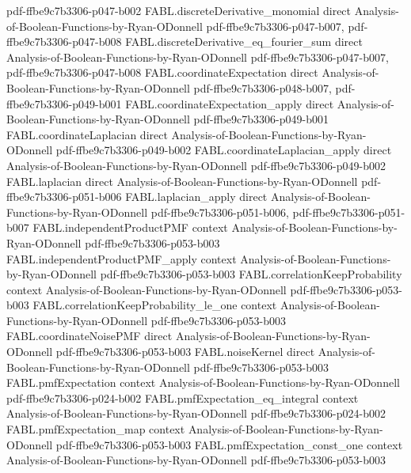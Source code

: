 \begin{theorem}
  {pdf-ffbe9c7b3306-p047-b002}
\proofstep
  {FABL.discreteDerivative_monomial}
  {direct}
  {Analysis-of-Boolean-Functions-by-Ryan-ODonnell}
  {pdf-ffbe9c7b3306-p047-b007,
    pdf-ffbe9c7b3306-p047-b008}
\proofstep
  {FABL.discreteDerivative_eq_fourier_sum}
  {direct}
  {Analysis-of-Boolean-Functions-by-Ryan-ODonnell}
  {pdf-ffbe9c7b3306-p047-b007,
    pdf-ffbe9c7b3306-p047-b008}
\proofstep
  {FABL.coordinateExpectation}
  {direct}
  {Analysis-of-Boolean-Functions-by-Ryan-ODonnell}
  {pdf-ffbe9c7b3306-p048-b007,
    pdf-ffbe9c7b3306-p049-b001}
\proofstep
  {FABL.coordinateExpectation_apply}
  {direct}
  {Analysis-of-Boolean-Functions-by-Ryan-ODonnell}
  {pdf-ffbe9c7b3306-p049-b001}
\proofstep
  {FABL.coordinateLaplacian}
  {direct}
  {Analysis-of-Boolean-Functions-by-Ryan-ODonnell}
  {pdf-ffbe9c7b3306-p049-b002}
\proofstep
  {FABL.coordinateLaplacian_apply}
  {direct}
  {Analysis-of-Boolean-Functions-by-Ryan-ODonnell}
  {pdf-ffbe9c7b3306-p049-b002}
\proofstep
  {FABL.laplacian}
  {direct}
  {Analysis-of-Boolean-Functions-by-Ryan-ODonnell}
  {pdf-ffbe9c7b3306-p051-b006}
\proofstep
  {FABL.laplacian_apply}
  {direct}
  {Analysis-of-Boolean-Functions-by-Ryan-ODonnell}
  {pdf-ffbe9c7b3306-p051-b006,
    pdf-ffbe9c7b3306-p051-b007}
\proofstep
  {FABL.independentProductPMF}
  {context}
  {Analysis-of-Boolean-Functions-by-Ryan-ODonnell}
  {pdf-ffbe9c7b3306-p053-b003}
\proofstep
  {FABL.independentProductPMF_apply}
  {context}
  {Analysis-of-Boolean-Functions-by-Ryan-ODonnell}
  {pdf-ffbe9c7b3306-p053-b003}
\proofstep
  {FABL.correlationKeepProbability}
  {context}
  {Analysis-of-Boolean-Functions-by-Ryan-ODonnell}
  {pdf-ffbe9c7b3306-p053-b003}
\proofstep
  {FABL.correlationKeepProbability_le_one}
  {context}
  {Analysis-of-Boolean-Functions-by-Ryan-ODonnell}
  {pdf-ffbe9c7b3306-p053-b003}
\proofstep
  {FABL.coordinateNoisePMF}
  {direct}
  {Analysis-of-Boolean-Functions-by-Ryan-ODonnell}
  {pdf-ffbe9c7b3306-p053-b003}
\proofstep
  {FABL.noiseKernel}
  {direct}
  {Analysis-of-Boolean-Functions-by-Ryan-ODonnell}
  {pdf-ffbe9c7b3306-p053-b003}
\proofstep
  {FABL.pmfExpectation}
  {context}
  {Analysis-of-Boolean-Functions-by-Ryan-ODonnell}
  {pdf-ffbe9c7b3306-p024-b002}
\proofstep
  {FABL.pmfExpectation_eq_integral}
  {context}
  {Analysis-of-Boolean-Functions-by-Ryan-ODonnell}
  {pdf-ffbe9c7b3306-p024-b002}
\proofstep
  {FABL.pmfExpectation_map}
  {context}
  {Analysis-of-Boolean-Functions-by-Ryan-ODonnell}
  {pdf-ffbe9c7b3306-p053-b003}
\proofstep
  {FABL.pmfExpectation_const_one}
  {context}
  {Analysis-of-Boolean-Functions-by-Ryan-ODonnell}
  {pdf-ffbe9c7b3306-p053-b003}

\end{theorem}

